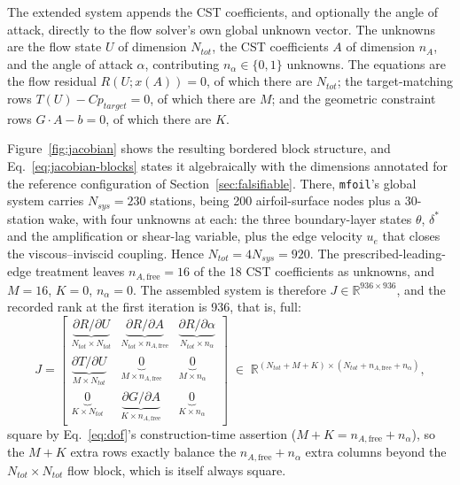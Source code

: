 The extended system appends the CST coefficients, and optionally the angle of
attack, directly to the flow solver's own global unknown vector. The unknowns
are the flow state $U$ of dimension $N_{tot}$, the CST coefficients $A$ of
dimension $n_A$, and the angle of attack $\alpha$, contributing $n_\alpha \in
\{0,1\}$ unknowns. The equations are the flow residual $R(U; x(A)) = 0$, of
which there are $N_{tot}$; the target-matching rows
$T(U) - Cp_{target} = 0$, of which there are $M$; and the geometric constraint
rows $G\cdot A - b = 0$, of which there are $K$.

Figure~\ref{fig:jacobian} shows the resulting bordered block structure, and
Eq.~\eqref{eq:jacobian-blocks} states it algebraically with the dimensions
annotated for the reference configuration of
Section~\ref{sec:falsifiable}. There, \texttt{mfoil}'s global system carries
$N_{sys}=230$ stations, being 200 airfoil-surface nodes plus a 30-station
wake, with four unknowns at each: the three boundary-layer states
$\theta$, $\delta^*$ and the amplification or shear-lag variable, plus the
edge velocity $u_e$ that closes the viscous--inviscid coupling. Hence
$N_{tot}=4N_{sys}=920$. The prescribed-leading-edge treatment leaves
$n_{A,\text{free}}=16$ of the 18 CST coefficients as unknowns, and $M=16$,
$K=0$, $n_\alpha=0$. The assembled system is therefore
$J\in\mathbb{R}^{936\times936}$, and the recorded rank at the first iteration
is 936, that is, full:
\begin{equation}
  J = \left[
  \begin{array}{c|c|c}
    \displaystyle\underbrace{\partial R/\partial U}_{N_{tot}\times N_{tot}} &
    \displaystyle\underbrace{\partial R/\partial A}_{N_{tot}\times n_{A,\text{free}}} &
    \displaystyle\underbrace{\partial R/\partial \alpha}_{N_{tot}\times n_\alpha} \\[1.1em] \hline
    \displaystyle\underbrace{\partial T/\partial U}_{M\times N_{tot}} &
    \displaystyle\underbrace{0}_{M\times n_{A,\text{free}}} &
    \displaystyle\underbrace{0}_{M\times n_\alpha} \\[1.1em] \hline
    \displaystyle\underbrace{0}_{K\times N_{tot}} &
    \displaystyle\underbrace{\partial G/\partial A}_{K\times n_{A,\text{free}}} &
    \displaystyle\underbrace{0}_{K\times n_\alpha}
  \end{array}
  \right]
  \;\in\; \mathbb{R}^{(N_{tot}+M+K)\times(N_{tot}+n_{A,\text{free}}+n_\alpha)},
  \label{eq:jacobian-blocks}
\end{equation}
square by Eq.~\eqref{eq:dof}'s construction-time assertion
($M+K=n_{A,\text{free}}+n_\alpha$), so the $M+K$ extra rows exactly balance the
$n_{A,\text{free}}+n_\alpha$ extra columns beyond the $N_{tot}\times N_{tot}$
flow block, which is itself always square.

